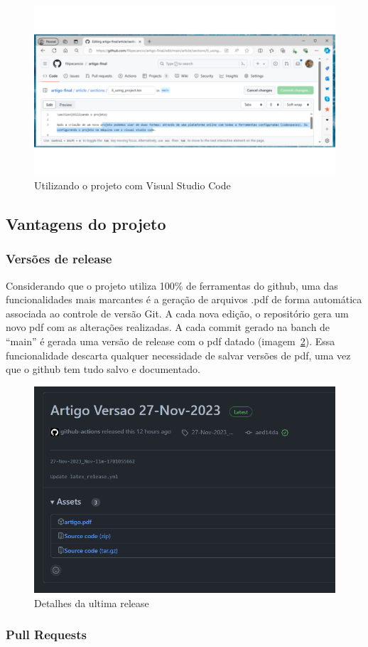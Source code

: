 \begin{figure}[ht]
	\centering
	\includegraphics[width=.6\textwidth]{./images/fig03.png}
	\caption{Utilizando o projeto com Visual Studio Code}
	\label{fig:fig03}
\end{figure}

\subsection{Vantagens do projeto}

\subsubsection{Versões de release}
Considerando que o projeto utiliza 100\% de ferramentas do github, uma das funcionalidades mais marcantes é a geração de arquivos .pdf de forma automática associada ao controle de versão Git. A cada nova edição, o repositório gera um novo pdf com as alterações realizadas. A cada commit gerado na banch de ``main'' é gerada uma versão de release com o pdf datado (imagem~\ref{fig:fig04}). Essa funcionalidade descarta qualquer necessidade de salvar versões de pdf, uma vez que o github tem tudo salvo e documentado.

\begin{figure}[ht]
	\centering
	\includegraphics[width=.6\textwidth]{./images/fig04.png}
	\caption{Detalhes da ultima release}
	\label{fig:fig04}
\end{figure}

\subsubsection{Pull Requests}

